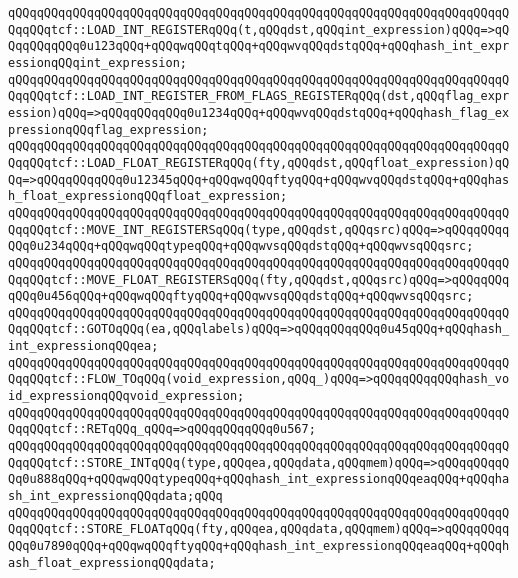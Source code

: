 \verb|qQQqqQQqqQQqqQQqqQQqqQQqqQQqqQQqqQQqqQQqqQQqqQQqqQQqqQQqqQQqqQQqqQQqqQQqqQQqtcf::LOAD_INT_REGISTERqQQq(t,qQQqdst,qQQqint_expression)qQQq=>qQQqqQQqqQQq0u123qQQq+qQQqwqQQqtqQQq+qQQqwvqQQqdstqQQq+qQQqhash_int_expressionqQQqint_expression;|\newline
\verb|qQQqqQQqqQQqqQQqqQQqqQQqqQQqqQQqqQQqqQQqqQQqqQQqqQQqqQQqqQQqqQQqqQQqqQQqqQQqtcf::LOAD_INT_REGISTER_FROM_FLAGS_REGISTERqQQq(dst,qQQqflag_expression)qQQq=>qQQqqQQqqQQq0u1234qQQq+qQQqwvqQQqdstqQQq+qQQqhash_flag_expressionqQQqflag_expression;|\newline
\verb|qQQqqQQqqQQqqQQqqQQqqQQqqQQqqQQqqQQqqQQqqQQqqQQqqQQqqQQqqQQqqQQqqQQqqQQqqQQqtcf::LOAD_FLOAT_REGISTERqQQq(fty,qQQqdst,qQQqfloat_expression)qQQq=>qQQqqQQqqQQq0u12345qQQq+qQQqwqQQqftyqQQq+qQQqwvqQQqdstqQQq+qQQqhash_float_expressionqQQqfloat_expression;|\newline
\verb|qQQqqQQqqQQqqQQqqQQqqQQqqQQqqQQqqQQqqQQqqQQqqQQqqQQqqQQqqQQqqQQqqQQqqQQqqQQqtcf::MOVE_INT_REGISTERSqQQq(type,qQQqdst,qQQqsrc)qQQq=>qQQqqQQqqQQq0u234qQQq+qQQqwqQQqtypeqQQq+qQQqwvsqQQqdstqQQq+qQQqwvsqQQqsrc;|\newline
\verb|qQQqqQQqqQQqqQQqqQQqqQQqqQQqqQQqqQQqqQQqqQQqqQQqqQQqqQQqqQQqqQQqqQQqqQQqqQQqtcf::MOVE_FLOAT_REGISTERSqQQq(fty,qQQqdst,qQQqsrc)qQQq=>qQQqqQQqqQQq0u456qQQq+qQQqwqQQqftyqQQq+qQQqwvsqQQqdstqQQq+qQQqwvsqQQqsrc;|\newline
\verb|qQQqqQQqqQQqqQQqqQQqqQQqqQQqqQQqqQQqqQQqqQQqqQQqqQQqqQQqqQQqqQQqqQQqqQQqqQQqtcf::GOTOqQQq(ea,qQQqlabels)qQQq=>qQQqqQQqqQQq0u45qQQq+qQQqhash_int_expressionqQQqea;|\newline
\newline
\verb|qQQqqQQqqQQqqQQqqQQqqQQqqQQqqQQqqQQqqQQqqQQqqQQqqQQqqQQqqQQqqQQqqQQqqQQqqQQqtcf::FLOW_TOqQQq(void_expression,qQQq_)qQQq=>qQQqqQQqqQQqhash_void_expressionqQQqvoid_expression;|\newline
\verb|qQQqqQQqqQQqqQQqqQQqqQQqqQQqqQQqqQQqqQQqqQQqqQQqqQQqqQQqqQQqqQQqqQQqqQQqqQQqtcf::RETqQQq_qQQq=>qQQqqQQqqQQq0u567;|\newline
\verb|qQQqqQQqqQQqqQQqqQQqqQQqqQQqqQQqqQQqqQQqqQQqqQQqqQQqqQQqqQQqqQQqqQQqqQQqqQQqtcf::STORE_INTqQQq(type,qQQqea,qQQqdata,qQQqmem)qQQq=>qQQqqQQqqQQq0u888qQQq+qQQqwqQQqtypeqQQq+qQQqhash_int_expressionqQQqeaqQQq+qQQqhash_int_expressionqQQqdata;qQQq|\newline
\verb|qQQqqQQqqQQqqQQqqQQqqQQqqQQqqQQqqQQqqQQqqQQqqQQqqQQqqQQqqQQqqQQqqQQqqQQqqQQqtcf::STORE_FLOATqQQq(fty,qQQqea,qQQqdata,qQQqmem)qQQq=>qQQqqQQqqQQq0u7890qQQq+qQQqwqQQqftyqQQq+qQQqhash_int_expressionqQQqeaqQQq+qQQqhash_float_expressionqQQqdata;|\newline
